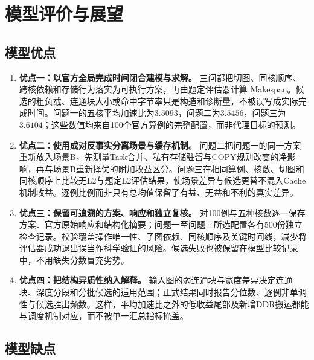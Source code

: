 \section{模型评价与展望}
\subsection{模型优点}

\begin{enumerate}
\item \textbf{优点一：以官方全局完成时间闭合建模与求解。} 三问都把切图、同核顺序、跨核依赖和存储行为落实为可执行方案，再由题定评估器计算 Makespan。候选的粗负载、连通块大小或命中字节率只是构造和诊断量，不被误写成实际完成时间。问题一的五核平均加速比为$3.5093$，问题二为$3.5456$，问题三为$3.6104$；这些数值均来自100个官方算例的完整配置，而非代理目标的预测。

\item \textbf{优点二：使用成对反事实分离场景与缓存机制。} 问题二把问题一的同一方案重新放入场景B，先测量Task合并、私有存储驻留与COPY规则改变的净影响，再与场景B重新择优的附加收益区分。问题三在相同算例、核数、切图和同核顺序上比较无L2与题定L2评估结果，使场景差异与候选更替不混入Cache机制收益。逐例比例而非只有总均值保留了有益、无益和不利的真实差异。

\item \textbf{优点三：保留可追溯的方案、响应和独立复核。} 对100例与五种核数逐一保存方案、官方原始响应和结构化摘要；问题一至问题三所选配置各有500份独立检查记录。校验覆盖操作唯一性、子图依赖、同核顺序及关键时间线，减少将评估器成功退出误当作科学验证的风险。候选失败也被保留在模型比较记录中，不用缺失分数冒充劣势。

\item \textbf{优点四：把结构异质性纳入解释。} 输入图的弱连通块与宽度差异决定连通块、深度分段和分批候选的适用范围；正式结果同时报告分位数、逐例非单调性与候选胜出频数。这样，平均加速比之外的低收益尾部及新增DDR搬运都能与调度机制对应，而不被单一汇总指标掩盖。
\end{enumerate}

\subsection{模型缺点}

